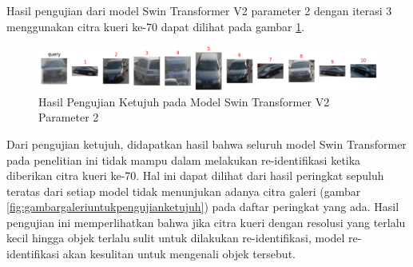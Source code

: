 Hasil pengujian dari model Swin Transformer V2 parameter 2 dengan iterasi 3 menggunakan citra kueri ke-70 dapat 
dilihat pada gambar \ref{fig:hasilpengujianketujuhpadamodelswintransformerv2param2}.

\begin{figure}[h!]
  \centering
  \includegraphics[scale=0.6]{gambar/Que70V2P2IT3.png}
  \caption{Hasil Pengujian Ketujuh pada Model Swin Transformer V2 Parameter 2}
  \label{fig:hasilpengujianketujuhpadamodelswintransformerv2param2}
\end{figure}

Dari pengujian ketujuh, didapatkan hasil bahwa seluruh model Swin Transformer pada penelitian ini tidak mampu dalam melakukan 
re-identifikasi ketika diberikan citra kueri ke-70. Hal ini dapat dilihat dari hasil peringkat sepuluh teratas dari setiap 
model tidak menunjukan adanya citra galeri (gambar \ref{fig:gambargaleriuntukpengujianketujuh}) pada daftar peringkat yang 
ada. Hasil pengujian ini memperlihatkan bahwa jika citra kueri dengan resolusi yang terlalu kecil hingga objek terlalu sulit 
untuk dilakukan re-identifikasi, model re-identifikasi akan kesulitan untuk mengenali objek tersebut.





